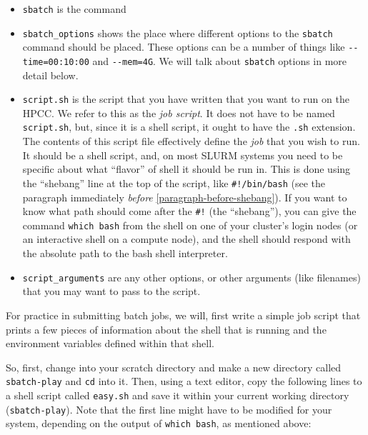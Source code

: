 \documentclass[]{krantz}
\providecommand{\tightlist}{%
  \setlength{\itemsep}{0pt}\setlength{\parskip}{0pt}}
\begin{document}
\begin{itemize}
\tightlist
\item
  \texttt{sbatch} is the command
\item
  \texttt{sbatch\_options} shows the place where different options to the \texttt{sbatch} command should
  be placed. These options can be a number of things like \texttt{-\/-time=00:10:00} and \texttt{-\/-mem=4G}.
  We will talk about \texttt{sbatch} options in more detail below.
\item
  \texttt{script.sh} is the script that you have written that you want to run on the HPCC. We refer to this
  as the \emph{job script}. It does not
  have to be named \texttt{script.sh}, but, since it is a shell script, it ought to have the \texttt{.sh} extension.
  The contents of this script file effectively
  define the \emph{job} that you wish to run. It should be a shell script, and, on most SLURM systems
  you need to be specific about what ``flavor'' of shell it should be run in. This is done using the
  ``shebang'' line at the top of the script, like \texttt{\#!/bin/bash} (see the paragraph immediately
  \emph{before} \ref{paragraph-before-shebang}). If you want to know what
  path should come after the \texttt{\#!} (the ``shebang''), you can give the command \texttt{which\ bash} from the shell
  on one of your cluster's login nodes (or an interactive shell on a compute node), and the
  shell should respond with the absolute path to the bash shell interpreter.
\item
  \texttt{script\_arguments} are any other options, or other arguments (like filenames) that you
  may want to pass to the script.
\end{itemize}

For practice in submitting batch jobs, we will, first write a simple job script that
prints a few pieces of information about the shell that is running and the environment
variables defined within that shell.

So, first, change into your scratch directory
and make a new directory called \texttt{sbatch-play} and \texttt{cd} into it. Then, using a text editor,
copy the following lines to a shell script called \texttt{easy.sh} and save it within
your current working directory (\texttt{sbatch-play}). Note that the first line might
have to be modified for your system, depending on the output of \texttt{which\ bash}, as mentioned
above:
\end{document}
